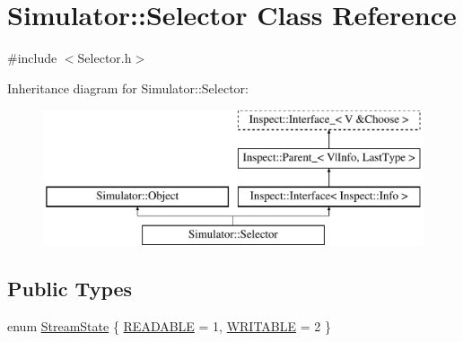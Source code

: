 \hypertarget{class_simulator_1_1_selector}{\section{Simulator\+:\+:Selector Class Reference}
\label{class_simulator_1_1_selector}
}


{\ttfamily \#include $<$Selector.\+h$>$}

Inheritance diagram for Simulator\+:\+:Selector\+:\begin{figure}[H]
\begin{center}
\leavevmode
\includegraphics[height=4.000000cm]{class_simulator_1_1_selector}
\end{center}
\end{figure}
\subsection*{Public Types}
\begin{DoxyCompactItemize}
\item 
enum \hyperlink{class_simulator_1_1_selector_ac8adf93ea9b0350b3b39dbbbf048d626}{Stream\+State} \{ \hyperlink{class_simulator_1_1_selector_ac8adf93ea9b0350b3b39dbbbf048d626a25020be816ec9c3d0c81db4827c49325}{R\+E\+A\+D\+A\+B\+L\+E} = 1, 
\hyperlink{class_simulator_1_1_selector_ac8adf93ea9b0350b3b39dbbbf048d626a2ed11b6827bcf957cb62d41dcfdd1025}{W\+R\+I\+T\+A\+B\+L\+E} = 2
 \}
\end{DoxyCompactItemize}
